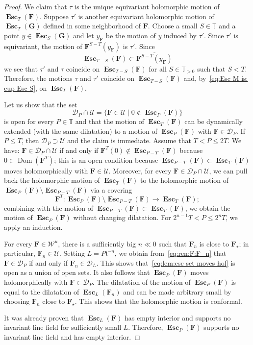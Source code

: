 \documentclass{amsart}
\newcommand{\Dom}{\operatorname {Dom}}
\newcommand{\1}{{\mathbb 1 }}
\newcommand\PT{\mathbb{ T}}
\newcommand{\bF}{{\mathbf F}}
\newcommand{\bG}{{\mathbf G}}
\newcommand{\str}{{\star}}
\renewcommand{\tt}{\mathfrak{t}}
\newcommand\Unst{{\boldsymbol{\mathcal{W}}^u}}
\newcommand\bUU{{ \boldsymbol{\mathcal U}}}
\theoremstyle{remark}
\numberwithin{equation}{section}
\theoremstyle{definition}
\newcommand{\Esc}{{\boldsymbol{\operatorname{Esc}}}}
\newcommand{\DEsc}{{\boldsymbol{\mathcal D}}}
\theoremstyle{nonumberbreak}
\begin{document}
\begin{proof}
 We claim that $\tau$ is the unique equivariant holomorphic motion of $\Esc_T(\bF)$. Suppose  $\tau'$ is another equivariant holomorphic motion of $\Esc_T(\bG)$ defined in some neighborhood of $\bF$. Choose a small $S\in \PT$ and a point $y\in \Esc_S(\bG)$ and let $y_\bF$ be the motion of $y$ induced by $\tau'$. Since $\tau'$ is equivariant, the motion of $\bF^{S-T}(y_{\bF})$ is $\tau'$. Since
\[ \Esc_{T-S}(\bF)\subset \overline {\bF^{S-T}(y_{\bF})}\] we see that $\tau'$ and $\tau$ coincide on $ \Esc_{T-S}(\bF)$ for all $S\in \PT_{>0}$ such that $S<T$. Therefore, the motions $\tau$ and $\tau'$ coincide on $\Esc_{T-S}(\bF)$ and, by~\eqref{eq:Esc M is: cup Esc S}, on $\Esc_{T}(\bF)$. 




 Let us show that the set
\begin{equation}
\label{eq:lem:esc set moves hol:2}
\DEsc_P\cap \bUU=\{\bF\in \bUU\mid 0\not \in \Esc_P(\bF)\}
\end{equation} is open for every $P\in \PT$ and that the motion of $\Esc_T(\bF)$ can be dynamically extended (with the same dilatation) to a motion of $\Esc_P(\bF)$ with $\bF\in \DEsc_P$. If $P\le T$, then $\DEsc_P\supset  \bUU$ and the claim is immediate. Assume that $T<P\le 2T$. We have: $\bF\in \DEsc_P\cap \bUU$ if and only if $\bF^{T}(0)\not \in \Esc_{P-T}(\bF)$ because $0\in \Dom(\bF^T)$; this is an open condition because $\Esc_{P-T}(\bF)\subset \Esc_{T}(\bF)$ moves holomorphically with $\bF\in\bUU$. Moreover, for every $\bF\in  \DEsc_P\cap \bUU$, we  can pull back the holomorphic motion of $ \Esc_T(\bF)$ to the holomorphic motion of $ \Esc_P(\bF)\setminus  \Esc_{P-T}(\bF)$ via a covering \[\bF^T\colon \Esc_P(\bF)\setminus  \Esc_{P-T}(\bF)\to \Esc_T(\bF);\] combining with the motion of $ \Esc_{P-T}(\bF)\subset \Esc_T(\bF)$, we obtain the motion of $\Esc_P(\bF)$ without changing dilatation. For $2^{n-1}T<P\le2^nT$, we apply an induction.

For every $\bF\in \Unst$, there is a sufficiently big $n\ll0$ such that $\bF_n$ is close to $\bF_\str$; in particular, $\bF_n\in \bUU$. Setting $L=P \tt^{-n}$, we obtain from~\eqref{eq:ren:F:F_n} that $\bF\in \DEsc_P$ if and only if $\bF_n\in \DEsc_L$. This shows that~\eqref{eq:lem:esc set moves hol} is open as a union of open sets. It also follows that $ \Esc_P(\bF)$ moves holomorphically with $\bF\in \DEsc_P$. The dilatation of the motion of $ \Esc_P(\bF)$ is equal to the dilatation of $\Esc_L(\bF_n)$ and can be made arbitrary small by choosing $\bF_n$ close to $\bF_\str$.  This shows that the holomorphic motion is conformal.

It was already proven that $\Esc_{L}(\bF)$ has empty interior and supports no invariant line field for sufficiently small $L$. Therefore, $\Esc_{P}(\bF)$ supports no invariant line field and has empty interior.
\end{proof}
\end{document}
